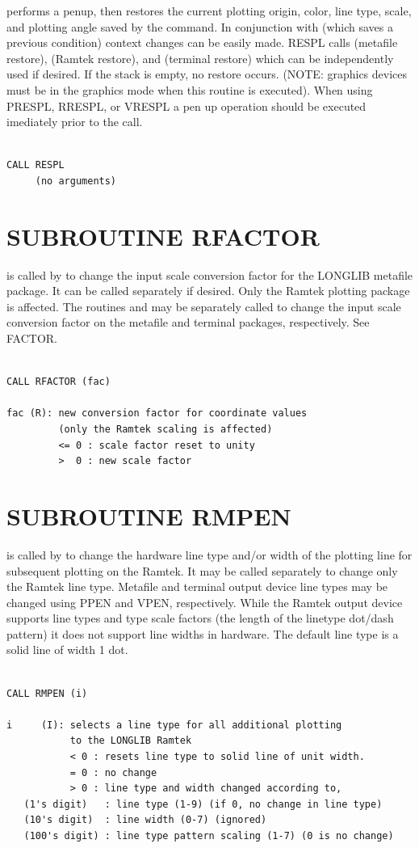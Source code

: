 \documentclass[11pt]{report}
\begin{document}
 performs a penup, then restores the current plotting origin,
color, line type, scale, and plotting angle saved by the 
command. In conjunction with  (which saves a previous
condition) context changes can be easily made.  RESPL calls 
(metafile restore),  (Ramtek restore), and 
(terminal restore) which can be independently used if desired.  If the
stack is empty, no restore occurs.  (NOTE: graphics devices must be in
the graphics mode when this routine is executed).  When using PRESPL,
RRESPL, or VRESPL a pen up operation should be executed imediately
prior to the call.
\begin{verbatim}

CALL RESPL
     (no arguments)
\end{verbatim}

\section{SUBROUTINE RFACTOR}

 is called by  to change the input scale conversion factor
for the LONGLIB metafile package.  It can be called separately if
desired.  Only the Ramtek plotting package is affected.  The
routines  and  may be separately called to
change the input scale conversion factor on the metafile and terminal
packages, respectively.  See FACTOR.
\begin{verbatim}

CALL RFACTOR (fac)

fac (R): new conversion factor for coordinate values
         (only the Ramtek scaling is affected)
         <= 0 : scale factor reset to unity
         >  0 : new scale factor
\end{verbatim}


\section{SUBROUTINE RMPEN}

 is called by  to change the hardware line type
and/or width of the plotting line for subsequent plotting on the
Ramtek.  It may be called separately to change only the Ramtek line
type.  Metafile and terminal output device line types may be changed
using PPEN and VPEN, respectively.  While the Ramtek output device
supports line types and type scale factors (the length of the linetype
dot/dash pattern) it does not support line widths in hardware.  The
default line type is a solid line of width 1 dot.
\begin{verbatim}

CALL RMPEN (i)

i     (I): selects a line type for all additional plotting
           to the LONGLIB Ramtek
           < 0 : resets line type to solid line of unit width.
           = 0 : no change
           > 0 : line type and width changed according to,
   (1's digit)   : line type (1-9) (if 0, no change in line type)
   (10's digit)  : line width (0-7) (ignored)
   (100's digit) : line type pattern scaling (1-7) (0 is no change)
\end{verbatim}
\end{document}
